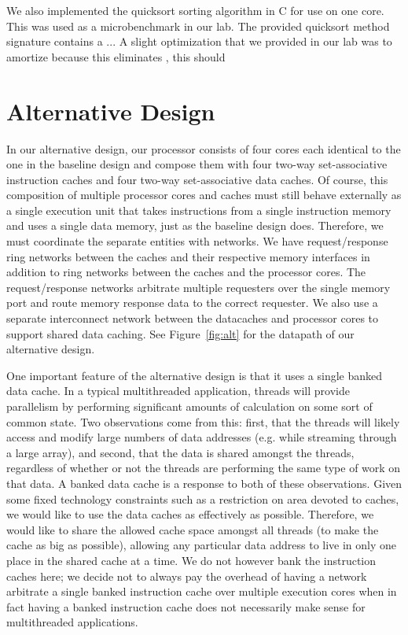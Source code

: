 \documentclass[10pt]{article}
\begin{document}
We also implemented the quicksort sorting algorithm in C for use on
one core. This was used as a microbenchmark in our lab. The provided quicksort method signature contains a ...
A slight optimization that we provided in our lab was to amortize
because this eliminates , this should 



\section{Alternative Design}

In our alternative design, our processor consists of four cores each identical to the one in the baseline design and compose them with four two-way set-associative instruction caches and four two-way set-associative data caches. Of course, this composition of multiple processor cores and caches must still behave externally as a single execution unit that takes instructions from a single instruction memory and uses a single data memory, just as the baseline design does. Therefore, we must coordinate the separate entities with networks. We have request/response ring networks between the caches and their respective memory interfaces in addition to ring networks between the caches and the processor cores. The request/response networks arbitrate multiple requesters over the single memory port and route memory response data to the correct requester. We also use a separate interconnect network between the datacaches and processor cores to support shared data caching. See Figure~\ref{fig:alt} for the datapath of our alternative design.

One important feature of the alternative design is that it uses a single banked data cache. In a typical multithreaded application, threads will provide parallelism by performing significant amounts of calculation on some sort of common state. Two observations come from this: first, that the threads will likely access and modify large numbers of data addresses (e.g. while streaming through a large array), and second, that the data is shared amongst the threads, regardless of whether or not the threads are performing the same type of work on that data. A banked data cache is a response to both of these observations. Given some fixed technology constraints such as a restriction on area devoted to caches, we would like to use the data caches as effectively as possible. Therefore, we would like to share the allowed cache space amongst all threads (to make the cache as big as possible), allowing any particular data address to live in only one place in the shared cache at a time. We do not however bank the instruction caches here; we decide not to always pay the overhead of having a network arbitrate a single banked instruction cache over multiple execution cores when in fact having a banked instruction cache does not necessarily make sense for multithreaded applications.
\end{document}
